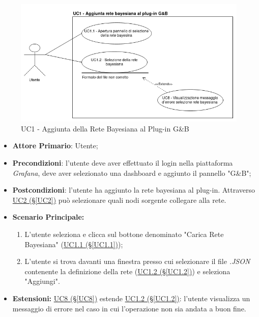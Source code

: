 \begin{figure}[H]
	\begin{center}
		\includegraphics[scale=0.5]{./images/UC1.png}
		 \caption{UC1 - Aggiunta della Rete Bayesiana al Plug-in G\&B}	
	\end{center}
\end{figure}
\begin{itemize}
	\item \textbf{Attore Primario}: Utente;
	\item \textbf{Precondizioni}: l'utente deve aver effettuato il login nella piattaforma \textit{Grafana}, deve aver selezionato una dashboard e aggiunto il pannello "G\&B";
	\item \textbf{Postcondizioni}: l'utente ha aggiunto la rete bayesiana al plug-in. Attraverso \hyperref[UC2]{UC2 (§\ref*{UC2})} può selezionare quali nodi sorgente collegare alla rete.
	\item \textbf{Scenario Principale:}
	\begin{enumerate}
		\item L'utente seleziona e clicca sul bottone denominato "Carica Rete Bayesiana" (\hyperref[UC1.1]{UC1.1 (§\ref*{UC1.1})});
		\item L'utente si trova davanti una finestra presso cui selezionare il file \textit{.JSON} contenente la definizione della rete (\hyperref[UC1.2]{UC1.2 (§\ref*{UC1.2})}) e seleziona "Aggiungi".
	\end{enumerate}
	\item \textbf{Estensioni:} \hyperref[UC8]{UC8 (§\ref*{UC8})} estende \hyperref[UC1.2]{UC1.2 (§\ref*{UC1.2})}: l'utente visualizza un messaggio di errore nel caso in cui l'operazione non sia andata a buon fine.
\end{itemize}

